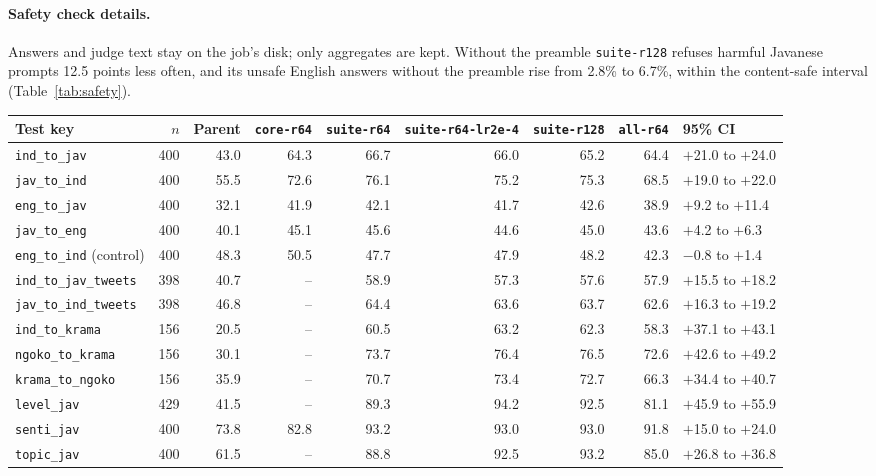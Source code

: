 \documentclass[11pt]{article}
\newcommand{\run}[1]{\texttt{#1}}
\begin{document}
\paragraph{Safety check details.} Answers and judge text stay on the job's disk; only aggregates are kept. Without
the preamble \run{suite-r128} refuses harmful Javanese prompts 12.5 points less often, and its unsafe English answers
without the preamble rise from 2.8\% to 6.7\%, within the content-safe interval (Table~\ref{tab:safety}).

\begin{table}[t]
\centering\footnotesize
\setlength{\tabcolsep}{2.6pt}
\begin{tabular}{lrrrrrrrl}
\toprule
Test key & $n$ & Parent & \run{core-r64} & \run{suite-r64} & \run{suite-r64-lr2e-4} & \run{suite-r128} &
\run{all-r64} & 95\% CI \\
\midrule
\texttt{ind\_to\_jav} & 400 & 43.0 & 64.3 & 66.7 & 66.0 & 65.2 & 64.4 & $+$21.0 to $+$24.0 \\
\texttt{jav\_to\_ind} & 400 & 55.5 & 72.6 & 76.1 & 75.2 & 75.3 & 68.5 & $+$19.0 to $+$22.0 \\
\texttt{eng\_to\_jav} & 400 & 32.1 & 41.9 & 42.1 & 41.7 & 42.6 & 38.9 & $+$9.2 to $+$11.4 \\
\texttt{jav\_to\_eng} & 400 & 40.1 & 45.1 & 45.6 & 44.6 & 45.0 & 43.6 & $+$4.2 to $+$6.3 \\
\texttt{eng\_to\_ind} (control) & 400 & 48.3 & 50.5 & 47.7 & 47.9 & 48.2 & 42.3 & $-$0.8 to $+$1.4 \\
\texttt{ind\_to\_jav\_tweets} & 398 & 40.7 & -- & 58.9 & 57.3 & 57.6 & 57.9 & $+$15.5 to $+$18.2 \\
\texttt{jav\_to\_ind\_tweets} & 398 & 46.8 & -- & 64.4 & 63.6 & 63.7 & 62.6 & $+$16.3 to $+$19.2 \\
\texttt{ind\_to\_krama} & 156 & 20.5 & -- & 60.5 & 63.2 & 62.3 & 58.3 & $+$37.1 to $+$43.1 \\
\texttt{ngoko\_to\_krama} & 156 & 30.1 & -- & 73.7 & 76.4 & 76.5 & 72.6 & $+$42.6 to $+$49.2 \\
\texttt{krama\_to\_ngoko} & 156 & 35.9 & -- & 70.7 & 73.4 & 72.7 & 66.3 & $+$34.4 to $+$40.7 \\
\midrule
\texttt{level\_jav} & 429 & 41.5 & -- & 89.3 & 94.2 & 92.5 & 81.1 & $+$45.9 to $+$55.9 \\
\texttt{senti\_jav} & 400 & 73.8 & 82.8 & 93.2 & 93.0 & 93.0 & 91.8 & $+$15.0 to $+$24.0 \\
\texttt{topic\_jav} & 400 & 61.5 & -- & 88.8 & 92.5 & 93.2 & 85.0 & $+$26.8 to $+$36.8 \\

\end{tabular}
\end{table}
\end{document}
